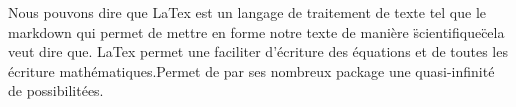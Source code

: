 Nous pouvons dire que LaTex est un langage de traitement de texte tel que le markdown qui permet de mettre en forme notre texte de manière \"scientifique\" cela veut dire que. LaTex permet une faciliter d'écriture des équations et de toutes les écriture mathématiques.Permet de par ses nombreux package une quasi-infinité de possibilitées.





















